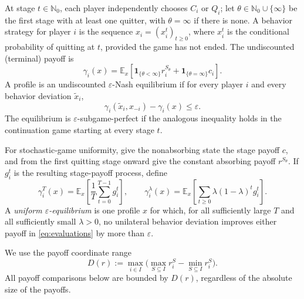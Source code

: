 \documentclass[11pt,a4paper]{article}
\numberwithin{equation}{section}
\theoremstyle{plain}
\theoremstyle{definition}
\theoremstyle{remark}
\newcommand{\NN}{\mathbb N_0}
\newcommand{\EE}{\mathbb E}
\newcommand{\one}{\mathbf 1}
\newcommand{\eps}{\varepsilon}
\begin{document}
At stage $t\in\NN$, each player independently chooses $C_i$ or $Q_i$;
let $\theta\in\NN\cup\{\infty\}$ be the first stage with at least one
quitter, with $\theta=\infty$ if there is none. A behavior strategy for
player $i$ is the sequence $x_i=(x_i^t)_{t\ge0}$, where $x_i^t$ is the
conditional probability of quitting at $t$, provided the game has not
ended. The undiscounted (terminal) payoff is
\begin{equation}\label{eq:gamma}
 \gamma_i(x)=\EE_x\!\left[
 \one_{\{\theta<\infty\}}r_i^{S_\theta}
 +\one_{\{\theta=\infty\}}c_i\right].
\end{equation}
A profile is an undiscounted $\eps$-Nash equilibrium if for every player
$i$ and every behavior deviation $\widetilde x_i$,
\begin{equation}\label{eq:undisc-eq}
 \gamma_i(\widetilde x_i,x_{-i})-\gamma_i(x)\le\eps.
\end{equation}
The equilibrium is $\eps$-subgame-perfect if the analogous inequality
holds in the continuation game starting at every stage $t$.

For stochastic-game uniformity, give the nonabsorbing state the stage
payoff $c$, and from the first quitting stage onward give the constant
absorbing payoff $r^{S_\theta}$. If $g_i^t$ is the resulting stage-payoff
process, define
\begin{equation}\label{eq:evaluations}
 \gamma_i^T(x)=\EE_x\left[\frac1T\sum_{t=0}^{T-1}g_i^t\right],\qquad
 \gamma_i^\lambda(x)=\EE_x\left[\sum_{t\ge0}\lambda(1-\lambda)^t g_i^t\right].
\end{equation}
A \emph{uniform $\eps$-equilibrium} is one profile $x$ for which,
for all sufficiently large $T$ and all sufficiently small $\lambda>0$,
no unilateral behavior deviation improves either payoff in
\eqref{eq:evaluations} by more than $\eps$.

We use the payoff coordinate range
\begin{equation}\label{eq:D}
 D(r):=\max_{i\in I}\bigl(\max_{S\subseteq I}r_i^S-\min_{S\subseteq I}r_i^S\bigr).
\end{equation}
All payoff comparisons below are bounded by $D(r)$, regardless of the
absolute size of the payoffs.
\end{document}
